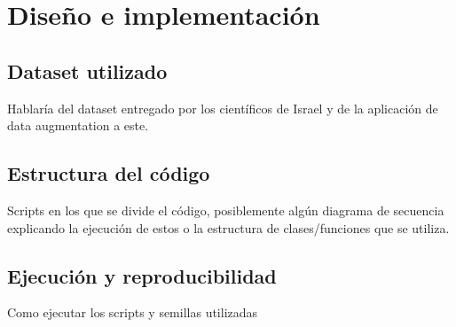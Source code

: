 \chapter{Diseño e implementación}

\section{Dataset utilizado}
Hablaría del dataset entregado por los científicos de Israel y de la aplicación de data augmentation a este.

\section{Estructura del código}
Scripts en los que se divide el código, posiblemente algún diagrama de secuencia explicando la ejecución de estos o la estructura de clases/funciones que se utiliza.

\section{Ejecución y reproducibilidad}
Como ejecutar los scripts y semillas utilizadas